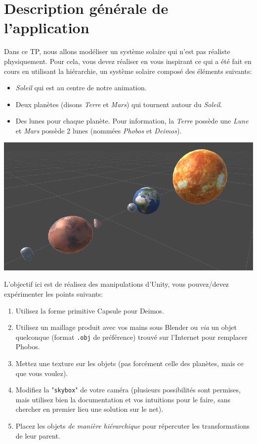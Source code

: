 \documentclass[a4paper,10pt]{article}
\begin{document}
\section{Description générale de l'application}

Dans ce TP, nous allons modéliser un système solaire qui n'est pas réaliste physiquement. Pour cela, vous devez réaliser en vous inspirant ce qui a été fait en cours en utilisant la hiérarchie, un système solaire composé des éléments suivants:
\begin{itemize}
	\item \textit{Soleil} qui est au centre de notre animation.
	\item Deux planètes (disons \textit{Terre} et \textit{Mars}) qui tournent autour du \textit{Soleil}.
	\item Des lunes pour chaque planète. Pour information, la \textit{Terre} possède une \textit{Lune} et \textit{Mars} possède 2 lunes (nommées \textit{Phobos} et \textit{Deimos}). 
\end{itemize}


\begin{center}
	\includegraphics[width=0.7\linewidth]{rc/solarsystem_ez}
\end{center}

L'objectif ici est de réalisez des manipulations d'Unity, vous pouvez/devez expérimenter les points suivants:
\begin{enumerate}
	\item Utilisez la forme primitive Capsule pour Deimos.
	\item Utilisez un maillage produit avec vos mains sous Blender ou \textit{via} un objet quelconque (format \texttt{.obj} de préférence) trouvé sur l'Internet pour remplacer Phobos.
	\item Mettez une texture sur les objets (pas forcément celle des planètes, mais ce que vous voulez).
	\item Modifiez la "\texttt{skybox}" de votre caméra (plusieurs possibilités sont permises, mais utilisez bien la documentation et vos intuitions pour le faire, sans chercher en premier lieu une solution sur le net).
	\item Placez les objets \textit{de manière hiérarchique} pour répercuter les transformations de leur parent.
\end{enumerate}
\end{document}
